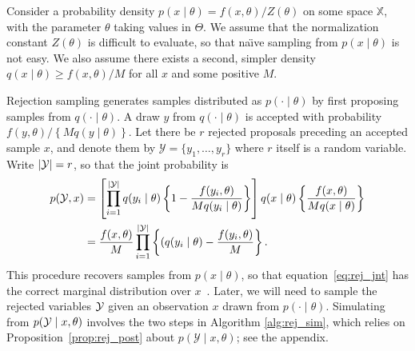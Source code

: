 Consider a probability density $p(x\mid\theta) = {f(x,\theta)}/{Z(\theta)}$ on some space $\mathbb{X}$, with the parameter $\theta$ 
taking values in $\Theta$.
We assume that the normalization constant $Z(\theta)$ is difficult to evaluate, so that na\"{\i}ve sampling from $p(x\mid\theta)$ is
not easy. We also assume there exists a second, simpler density $q(x\mid\theta) \ge  f(x, \theta)/M$ for all $x$ and some positive $M$.


Rejection sampling generates samples distributed as $p(\cdot\mid\theta)$ by first proposing samples from $q(\cdot\mid\theta)$. A draw $y$ from 
$q(\cdot\mid\theta)$ is accepted with probability ${ f(y, \theta)}/\left\{M q(y\mid\theta)\right\}$. Let there be $r$ rejected proposals preceding an accepted sample 
$x$, and denote
them by $\mathcal{Y} = \{y_1, \ldots, y_r \}$ where $r$ itself is a random variable. Write $|\mathcal{Y}| = r$, so that the joint probability is
\begin{align}
  p(\mathcal{Y}, x) & = \left[ \prod_{i=1}^{|\cY|} q(y_i\mid\theta) \left\{1 - \frac{f(y_i, \theta)}{M q(y_i\mid\theta)}\right\} \right]
                        q(x\mid\theta) \left\{ \frac{ f(x, \theta)}{M q(x\mid\theta)} \right\} \nonumber \\
                    & =  \frac{f(x, \theta)}{M} \prod_{i=1}^{|\mathcal{Y}|}  \left\{(q(y_i\mid\theta) - \frac{ f(y_i, \theta)}{M} \right\}. \label{eq:rej_jnt}
\end{align}
This procedure recovers samples from $p(x\mid\theta)$, so that equation~\eqref{eq:rej_jnt} has the correct marginal distribution over $x$~\citep[page 51]{Robert05}.
Later, we will need to sample the rejected variables $\mathcal{Y}$ given an observation $x$ drawn from $p(\cdot\mid\theta)$. 
Simulating from $p(\mathcal{Y}\mid x,\theta)$ involves the two steps in Algorithm \ref{alg:rej_sim},
which relies on Proposition~\ref{prop:rej_post} about $p(\mathcal{Y}\mid x,\theta)$; see %
the appendix. 

